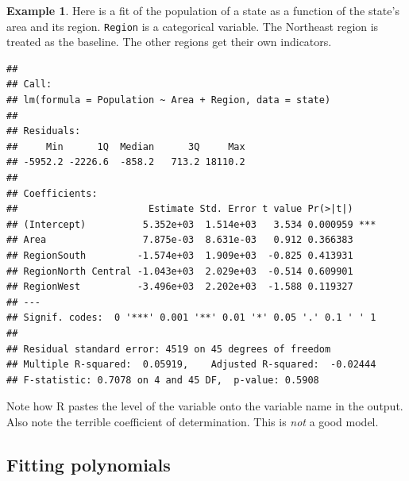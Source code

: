 \documentclass[
]{book}
\newenvironment{Shaded}{\begin{snugshade}}{\end{snugshade}}
\newcommand{\AttributeTok}[1]{\textcolor[rgb]{0.13,0.29,0.53}{#1}}
\newcommand{\FunctionTok}[1]{\textcolor[rgb]{0.13,0.29,0.53}{\textbf{#1}}}
\newcommand{\NormalTok}[1]{#1}
\newcommand{\OtherTok}[1]{\textcolor[rgb]{0.56,0.35,0.01}{#1}}
\newcommand{\SpecialCharTok}[1]{\textcolor[rgb]{0.81,0.36,0.00}{\textbf{#1}}}
\theoremstyle{definition}
\theoremstyle{definition}
\newtheorem{example}{Example}[chapter]
\theoremstyle{definition}
\theoremstyle{definition}
\theoremstyle{remark}
\begin{document}
\begin{examplebox}

\begin{example}
Here is a fit of the population of a state as a function of the state's area and its region. \texttt{Region} is a categorical variable. The Northeast region is treated as the baseline. The other regions get their own indicators.

\begin{Shaded}
\end{Shaded}

\begin{verbatim}
## 
## Call:
## lm(formula = Population ~ Area + Region, data = state)
## 
## Residuals:
##     Min      1Q  Median      3Q     Max 
## -5952.2 -2226.6  -858.2   713.2 18110.2 
## 
## Coefficients:
##                       Estimate Std. Error t value Pr(>|t|)    
## (Intercept)          5.352e+03  1.514e+03   3.534 0.000959 ***
## Area                 7.875e-03  8.631e-03   0.912 0.366383    
## RegionSouth         -1.574e+03  1.909e+03  -0.825 0.413931    
## RegionNorth Central -1.043e+03  2.029e+03  -0.514 0.609901    
## RegionWest          -3.496e+03  2.202e+03  -1.588 0.119327    
## ---
## Signif. codes:  0 '***' 0.001 '**' 0.01 '*' 0.05 '.' 0.1 ' ' 1
## 
## Residual standard error: 4519 on 45 degrees of freedom
## Multiple R-squared:  0.05919,    Adjusted R-squared:  -0.02444 
## F-statistic: 0.7078 on 4 and 45 DF,  p-value: 0.5908
\end{verbatim}

Note how R pastes the level of the variable onto the variable name in the output. Also note the terrible coefficient of determination. This is \emph{not} a good model.
\end{example}

\end{examplebox}

\subsection*{Fitting polynomials}\label{fitting-polynomials}
\end{document}
